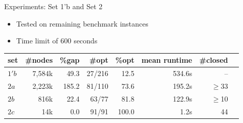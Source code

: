 \documentclass{beamer}
\begin{document}
\begin{frame}{Experiments: Set 1'b and Set 2}
	\begin{itemize}
		\item Tested on remaining benchmark instances
		\item Time limit of 600 seconds \pause
	\end{itemize}
	\begin{table}[ptb]
		\setlength{\tabcolsep}{5pt}
		\begin{tabular}{lrrrrrrr}
			\toprule
			set & \#nodes & \%gap & \#opt & \%opt & mean runtime & {\color{red} \#closed} \\
			\midrule
			$1'b$ & 7,584k & 49.3 & 27/216 & 12.5 & 534.6s & {\color{red} --} \\
			$2a$ & 2,223k & 185.2 & 81/110 & 73.6 & 195.2s & {\color{red} $\geq$33 } \\
			$2b$ & 816k & 22.4 & 63/77 & 81.8 & 122.9s & {\color{red} $\geq$10 } \\
			$2c$ & 14k & 0.0 & 91/91 & 100.0 & 1.2s & {\color{red} 44 } \\
			\bottomrule
		\end{tabular}
		\label{tab:benchmarks}
	\end{table}
\end{frame}
\end{document}
